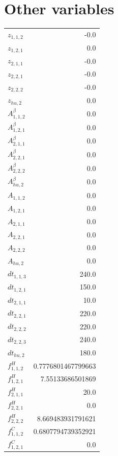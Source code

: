 \documentclass{article}%
\makeatletter
\let\mcnewpage=\newpage%
\newcommand{\TrickSupertabularIntoMulticols}{%
\renewcommand\newpage{%
\if@firstcolumn%
\hrule width\linewidth height0pt%
\columnbreak%
\else%
\mcnewpage%
\fi%
}%
}%
\makeatother
\begin{document}
\section{Other variables}%
\thispagestyle{plain}%
\begin{multicols*}{3}%
\TrickSupertabularIntoMulticols%
%
\begin{supertabular}{lr}%
	$z_{1,1,2}$ & -0.0 \\%
	$z_{1,2,1}$ & 0.0 \\%
	$z_{2,1,1}$ & -0.0 \\%
	$z_{2,2,1}$ & -0.0 \\%
	$z_{2,2,2}$ & -0.0 \\%
	$z_{hu,2}$ & 0.0 \\%
	$A_{1,1,2}^{\beta}$ & 0.0 \\%
	$A_{1,2,1}^{\beta}$ & 0.0 \\%
	$A_{2,1,1}^{\beta}$ & 0.0 \\%
	$A_{2,2,1}^{\beta}$ & 0.0 \\%
	$A_{2,2,2}^{\beta}$ & 0.0 \\%
	$A_{hu,2}^{\beta}$ & 0.0 \\%
	$A_{1,1,2}$ & 0.0 \\%
	$A_{1,2,1}$ & 0.0 \\%
	$A_{2,1,1}$ & 0.0 \\%
	$A_{2,2,1}$ & 0.0 \\%
	$A_{2,2,2}$ & 0.0 \\%
	$A_{hu,2}$ & 0.0 \\%
	$dt_{1,1,3}$ & 240.0 \\%
	$dt_{1,2,1}$ & 150.0 \\%
	$dt_{2,1,1}$ & 10.0 \\%
	$dt_{2,2,1}$ & 220.0 \\%
	$dt_{2,2,2}$ & 220.0 \\%
	$dt_{2,2,3}$ & 240.0 \\%
	$dt_{hu,2}$ & 180.0 \\%
	$f_{1,1,2}^{H}$ & 0.7776801467799663 \\%
	$f_{1,2,1}^{H}$ & 7.55133686501869 \\%
	$f_{2,1,1}^{H}$ & 20.0 \\%
	$f_{2,2,1}^{H}$ & 0.0 \\%
	$f_{2,2,2}^{H}$ & 8.669483931791621 \\%
	$f_{1,1,2}^{C}$ & 0.6807794739352921 \\%
	$f_{1,2,1}^{C}$ & 0.0 \\%

\end{supertabular}
\end{multicols*}
\end{document}
